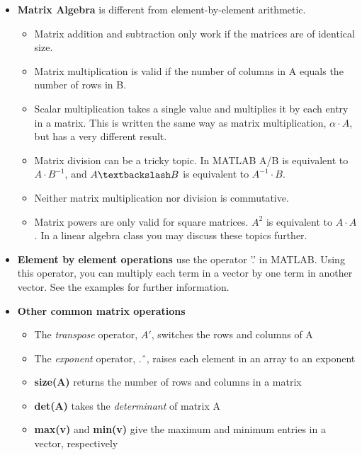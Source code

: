 \documentclass[paper=a4, fontsize=11pt]{scrartcl} %
\numberwithin{equation}{section} %
\numberwithin{figure}{section} %
\numberwithin{table}{section} %
\begin{document}
\begin{itemize}
\item \textbf{Matrix Algebra} is different from element-by-element arithmetic. 
\begin{itemize}
\item Matrix addition and subtraction only work if the matrices are of identical size. 

\item Matrix multiplication is valid if the number of columns in A equals the number of rows in B.

\item Scalar multiplication takes a single value and multiplies it by each entry in a matrix. 
This is written the same way as matrix multiplication, $\alpha \cdot A$, but has a very different result.

\item Matrix division can be a tricky topic. 
In MATLAB A/B is equivalent to $A\cdot B^{-1}$, and $A \textbackslash B$ is equivalent to $A^{-1}\cdot B$. 
\item Neither matrix multiplication nor division is commutative.

\item Matrix powers are only valid for square matrices.
$A^2$ is equivalent to $A \cdot A$.
In a linear algebra class you may discuss these topics further. 
\end{itemize}

\item \textbf{Element by element operations} use the operator '.' in MATLAB. 
Using this operator, you can multiply each term in a vector by one term in another vector.
See the examples for further information.

\item \textbf{Other common matrix operations}
	\begin{itemize}
	\item The \textit{transpose} operator, $A'$, switches the rows and columns of A
	\item The \textit{exponent} operator, .\^\ , raises each element in an array to an exponent
	\item \textbf{size(A)} returns the number of rows and columns in a matrix
	\item \textbf{det(A)} takes the \textit{determinant} of matrix A
	\item \textbf{max(v)} and \textbf{min(v)} give the maximum and minimum entries in a vector, respectively
	
	\end{itemize}


\end{itemize}
\end{document}
